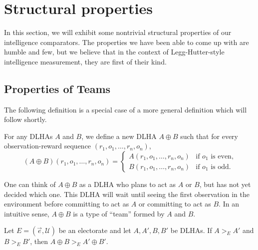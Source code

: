 \documentclass[twoside,11pt]{article}
\begin{document}
\section{Structural properties}
\label{structuralpropertiessection}

In this section, we will exhibit some nontrivial structural properties of
our intelligence comparators.
The properties we have been able to come up with are humble and few,
but we believe that in the context of Legg-Hutter-style intelligence measurement, they are
first of their kind.

\subsection{Properties of Teams}

The following definition is a special case of a more general definition which will
follow shortly.

\begin{definition}
\label{flexiblespecialcase}
For any DLHAs $A$ and $B$, we define a new
DLHA $A\oplus B$ such that for every observation-reward sequence
$(r_1,o_1,\ldots,r_n,o_n)$,
\[
(A\oplus B)(r_1,o_1,\ldots,r_n,o_n) =
    \begin{cases}
        A(r_1,o_1,\ldots,r_n,o_n) & \mbox{if $o_1$ is even,}\\
        B(r_1,o_1,\ldots,r_n,o_n) & \mbox{if $o_1$ is odd.}
    \end{cases}
\]
\end{definition}

One can think of $A\oplus B$ as a DLHA who plans to act as $A$ or $B$,
but has not yet decided which one. This DLHA will wait until seeing the first
observation in the environment before committing to act as $A$ or committing
to act as $B$. In an intuitive sense, $A\oplus B$ is a type of ``team'' formed
by $A$ and $B$.

\begin{proposition}
\label{EvenOddComboProposition}
Let $E=(\vec{e},\mathscr U)$ be an electorate
and let $A,A',B,B'$ be DLHAs.
If $A>_{E}A'$ and $B>_{E}B'$,
then $A\oplus B >_{E} A'\oplus B'$.
\end{proposition}
\end{document}
